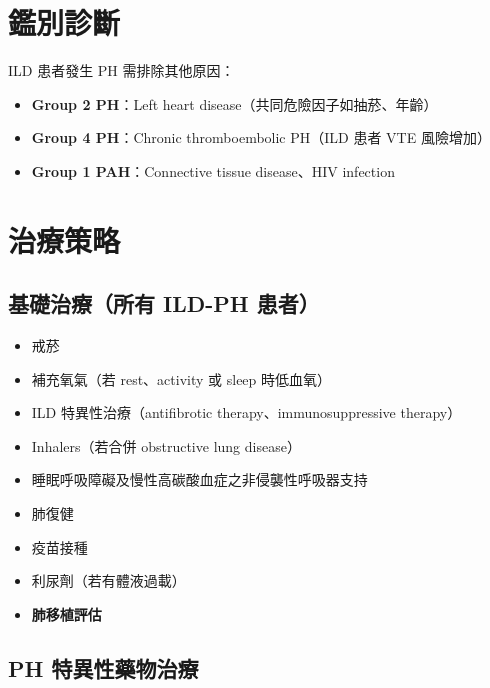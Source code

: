 \documentclass[11pt,a4paper]{article}
\begin{document}
\section{鑑別診斷}

ILD 患者發生 PH 需排除其他原因：

\begin{itemize}
    \item \textbf{Group 2 PH}：Left heart disease（共同危險因子如抽菸、年齡）
    \item \textbf{Group 4 PH}：Chronic thromboembolic PH（ILD 患者 VTE 風險增加）
    \item \textbf{Group 1 PAH}：Connective tissue disease、HIV infection
\end{itemize}

\section{治療策略}

\subsection{基礎治療（所有 ILD-PH 患者）}

\begin{itemize}
    \item 戒菸
    \item 補充氧氣（若 rest、activity 或 sleep 時低血氧）
    \item ILD 特異性治療（antifibrotic therapy、immunosuppressive therapy）
    \item Inhalers（若合併 obstructive lung disease）
    \item 睡眠呼吸障礙及慢性高碳酸血症之非侵襲性呼吸器支持
    \item 肺復健
    \item 疫苗接種
    \item 利尿劑（若有體液過載）
    \item \textbf{肺移植評估}
\end{itemize}

\subsection{PH 特異性藥物治療}
\end{document}
